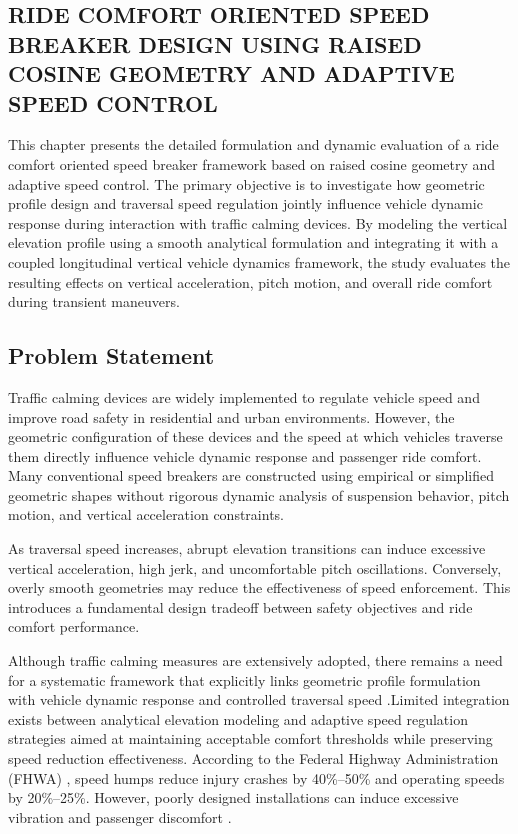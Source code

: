 \documentclass[a4paper,12pt,one side]{report}
\theoremstyle{definition}
\begin{document}
\begin{itemize}
\chapter{RIDE COMFORT ORIENTED SPEED BREAKER DESIGN USING RAISED COSINE GEOMETRY AND ADAPTIVE SPEED CONTROL}

This chapter presents the detailed formulation and dynamic evaluation of a ride comfort oriented speed breaker framework based on raised cosine geometry and adaptive speed control. The primary objective is to investigate how geometric profile design and traversal speed regulation jointly influence vehicle dynamic response during interaction with traffic calming devices. By modeling the vertical elevation profile using a smooth analytical formulation and integrating it with a coupled longitudinal vertical vehicle dynamics framework, the study evaluates the resulting effects on vertical acceleration, pitch motion, and overall ride comfort during transient maneuvers.

\section{Problem Statement}

Traffic calming devices are widely implemented to regulate vehicle speed and improve road safety in residential and urban environments. However, the geometric configuration of these devices and the speed at which vehicles traverse them directly influence vehicle dynamic response and passenger ride comfort. Many conventional speed breakers are constructed using empirical or simplified geometric shapes without rigorous dynamic analysis of suspension behavior, pitch motion, and vertical acceleration constraints.

As traversal speed increases, abrupt elevation transitions can induce excessive vertical acceleration, high jerk, and uncomfortable pitch oscillations. Conversely, overly smooth geometries may reduce the effectiveness of speed enforcement. This introduces a fundamental design tradeoff between safety objectives and ride comfort performance.

Although traffic calming measures are extensively adopted, there remains a need for a systematic framework that explicitly links geometric profile formulation with vehicle dynamic response and controlled traversal speed \cite{boateng2025prevalence}.Limited integration exists between analytical elevation modeling and adaptive speed regulation strategies aimed at maintaining acceptable comfort thresholds while preserving speed reduction effectiveness. According to the Federal Highway Administration (FHWA) \cite{fhwa2023}, speed humps reduce injury crashes by 40\%--50\% and operating speeds by 20\%--25\%. However, poorly designed installations can induce excessive vibration and passenger discomfort \cite{gedik2019investigation}.


\end{itemize}
\end{document}
